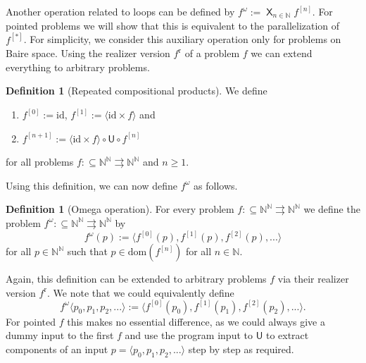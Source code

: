 \documentclass[11pt,a4paper]{amsart}
\theoremstyle{plain}
\theoremstyle{definition}
\newtheorem{defi}[thm]{Definition}
\theoremstyle{defC}
\theoremstyle{thmC}
\theoremstyle{plain}
\numberwithin{equation}{section}
\def\r{\mathrm{r}}
\def\IN{{\mathbb{N}}}
\def\In{\subseteq}
\def\mto{\rightrightarrows}
\def\U{{\mathsf{{U}}}}
\def\r{\mathrm{r}}
\def\bigtimes{\mathop{\mathsf{X}}}
\def\id{{\mathrm{id}}}
\def\dom{{\mathrm{dom}}}
\begin{document}
\noindent
Another operation related to loops can be defined by $f^\omega:=\bigtimes_{n\in\IN}f^{[n]}$.
For pointed problems we will show that this is equivalent to the
parallelization of $f^{[*]}$. 
For simplicity, we 
consider this auxiliary operation only for problems on Baire space.
Using the realizer version $f^\r$ of a problem $f$ we can extend everything to arbitrary problems.

\begin{defi}[Repeated compositional products]
We define
\begin{enumerate}
\item $f^{[0]}:=\id$, $f^{[1]}:=\langle\id\times f\rangle$ and 
\item $f^{[n+1]}:=\langle\id\times f\rangle\circ\U\circ f^{[n]}$ 
\end{enumerate}
for all problems $f:\In\IN^\IN\mto\IN^\IN$ and $n\geq1$.
\end{defi}

\noindent
Using this definition, we can now define $f^\omega$ as follows.

\begin{defi}[Omega operation]
For every problem $f:\In\IN^\IN\mto\IN^\IN$ we define the problem ${f^\omega:\In\IN^\IN\mto\IN^\IN}$ by
\[f^\omega(p):=\langle f^{[0]}(p),f^{[1]}(p),f^{[2]}(p),...\rangle\]
for all $p\in\IN^\IN$ such that $p\in\dom(f^{[n]})$ for all $n\in\IN$.
\end{defi}

\noindent
Again, this definition can be extended to arbitrary problems $f$ via their realizer version $f^\r$.
We note that we could equivalently define 
\[f^\omega\langle p_0,p_1,p_2,...\rangle:=\langle f^{[0]}(p_0),f^{[1]}(p_1),f^{[2]}(p_2),...\rangle.\]
For pointed $f$ this makes no essential difference, as we could always give a dummy input to the first $f$
and use the program input to $\U$ to extract components of an input $p=\langle p_0,p_1,p_2,...\rangle$ step by step as required.
\end{document}
